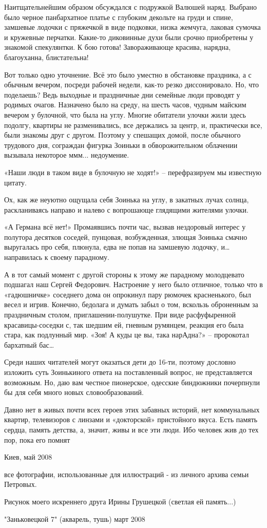 Наитщательнейшим образом обсуждался с подружкой Валюшей наряд. Выбрано было
черное панбархатное платье с глубоким декольте на груди и спине, замшевые
лодочки с пряжечкой в виде подковки, низка жемчуга, лаковая сумочка и кружевные
перчатки. Какие-то диковинные духи были срочно приобретены у знакомой
спекулянтки. К бою готова! Завораживающе красива, нарядна, благоуханна,
блистательна!

Вот только одно уточнение. Всё это было уместно в обстановке праздника, а с
обычным вечером, посреди рабочей недели, как-то резко диссонировало. Но, что
поделаешь? Ведь выходные и праздничные дни семейные люди проводят у родимых
очагов. Назначено было на среду, на шесть часов, чудным майским вечером у
булочной, что была на углу. Многие обитатели улочки жили здесь подолгу,
квартиры не разменивались, все держались за центр, и, практически все, были
знакомы друг с другом. Поэтому у спешащих домой, после обычного трудового дня,
сограждан фигурка Зоиньки в обворожительном облачении вызывала некоторое ммм...
недоумение.

«Наши люди в таком виде в булочную не ходят!» – перефразируем мы известную
цитату.

Ох, как же неуютно ощущала себя Зоинька на углу, в закатных лучах солнца,
раскланиваясь направо и налево с вопрошающе глядящими жителями улочки.

«А Германа всё нет!» Промаявшись почти час, вызвав нездоровый интерес у
полутора десятков соседей, пунцовая, возбужденная, злющая Зоинька смачно
выругалась про себя, плюнула, едва не попав на замшевую лодочку, и… направилась
к своему парадному.

А в тот самый момент с другой стороны к этому же парадному молодцевато подшагал
наш Сергей Федорович. Настроение у него было отличное, только что в
«гадюшничке» соседнего дома он опрокинул пару рюмочек красненького, был весел и
игрив. Конечно, бедолага и думать забыл о том, вскользь оброненным за
праздничным столом, приглашении-полушутке. При виде расфуфыренной
красавицы-соседки с, так шедшим ей, гневным румянцем, реакция его была стара,
как подлунный мир. «Зоя! А куды це вы, така нарАдна?» – пророкотал бархатный
бас…

Среди наших читателей могут оказаться дети до 16-ти, поэтому дословно изложить
суть Зоинькиного ответа на поставленный вопрос, не представляется возможным.
Но, даю вам честное пионерское, одесские биндюжники почерпнули бы для себя
много новых словообразований.

Давно нет в живых почти всех героев этих забавных историй, нет коммунальных
квартир, телевизоров с линзами и «докторской» пристойного вкуса. Есть память
сердца, память детства, а, значит, живы и все эти люди. Ибо человек жив до тех
пор, пока его помнят

Киев, май 2008

все фотографии, использованные для иллюстраций - из личного архива семьи
Петровых.

Рисунок  моего искреннего друга Ирины Грушецкой (светлая ей память...)

"Заньковецкой 7" (акварель, тушь) март 2008

